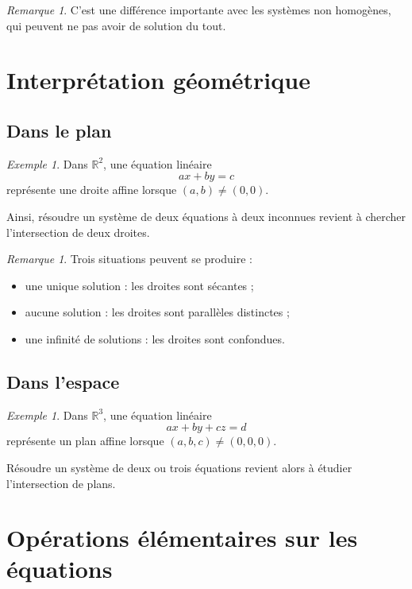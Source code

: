 \documentclass[11pt,a4paper]{article}
\theoremstyle{remark}
\newtheorem{remarque}[definition]{Remarque}
\newtheorem{exemple}[definition]{Exemple}
\newcommand{\R}{\mathbb{R}}
\begin{document}
\begin{remarque}
C’est une différence importante avec les systèmes non homogènes, qui peuvent ne pas avoir de solution du tout.
\end{remarque}

\section{Interprétation géométrique}

\subsection{Dans le plan}

\begin{exemple}
Dans \(\R^2\), une équation linéaire
\[
ax+by=c
\]
représente une droite affine lorsque \((a,b)\neq (0,0)\).

Ainsi, résoudre un système de deux équations à deux inconnues revient à chercher l’intersection de deux droites.
\end{exemple}

\begin{remarque}
Trois situations peuvent se produire :
\begin{itemize}
    \item une unique solution : les droites sont sécantes ;
    \item aucune solution : les droites sont parallèles distinctes ;
    \item une infinité de solutions : les droites sont confondues.
\end{itemize}
\end{remarque}

\subsection{Dans l’espace}

\begin{exemple}
Dans \(\R^3\), une équation linéaire
\[
ax+by+cz=d
\]
représente un plan affine lorsque \((a,b,c)\neq (0,0,0)\).

Résoudre un système de deux ou trois équations revient alors à étudier l’intersection de plans.
\end{exemple}

\section{Opérations élémentaires sur les équations}
\end{document}
